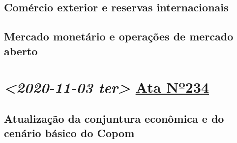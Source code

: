 \documentclass[11pt]{article}
\begin{document}
\subsection*{Comércio exterior e reservas internacionais}
\label{sec:orgf39c737}
\subsection*{Mercado monetário e operações de mercado aberto}
\label{sec:orge0c1171}
\section*{\textit{<2020-11-03 ter> } \href{https://www.bcb.gov.br/publicacoes/atascopom/28102020}{Ata Nº234}}
\label{sec:orgd74e3c0}
\subsection*{Atualização da conjuntura econômica e do cenário básico do Copom}
\label{sec:org3d4b5d2}
\end{document}
